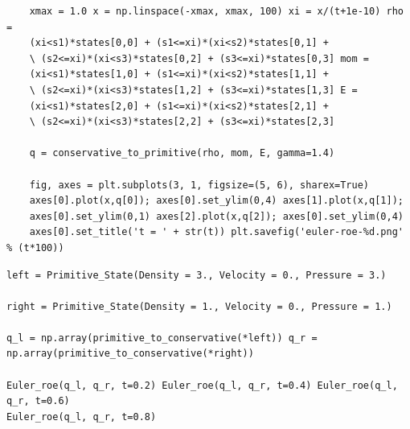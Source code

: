 \begin{verbatim}
    xmax = 1.0 x = np.linspace(-xmax, xmax, 100) xi = x/(t+1e-10) rho =
    (xi<s1)*states[0,0] + (s1<=xi)*(xi<s2)*states[0,1] +
    \ (s2<=xi)*(xi<s3)*states[0,2] + (s3<=xi)*states[0,3] mom =
    (xi<s1)*states[1,0] + (s1<=xi)*(xi<s2)*states[1,1] +
    \ (s2<=xi)*(xi<s3)*states[1,2] + (s3<=xi)*states[1,3] E =
    (xi<s1)*states[2,0] + (s1<=xi)*(xi<s2)*states[2,1] +
    \ (s2<=xi)*(xi<s3)*states[2,2] + (s3<=xi)*states[2,3]
    
    q = conservative_to_primitive(rho, mom, E, gamma=1.4)

    fig, axes = plt.subplots(3, 1, figsize=(5, 6), sharex=True)
    axes[0].plot(x,q[0]); axes[0].set_ylim(0,4) axes[1].plot(x,q[1]);
    axes[0].set_ylim(0,1) axes[2].plot(x,q[2]); axes[0].set_ylim(0,4)
    axes[0].set_title('t = ' + str(t)) plt.savefig('euler-roe-%d.png' % (t*100))
\end{verbatim}

\begin{verbatim}    
left = Primitive_State(Density = 3., Velocity = 0., Pressure = 3.)

right = Primitive_State(Density = 1., Velocity = 0., Pressure = 1.)

q_l = np.array(primitive_to_conservative(*left)) q_r =
np.array(primitive_to_conservative(*right))

Euler_roe(q_l, q_r, t=0.2) Euler_roe(q_l, q_r, t=0.4) Euler_roe(q_l, q_r, t=0.6)
Euler_roe(q_l, q_r, t=0.8)
\end{verbatim}

